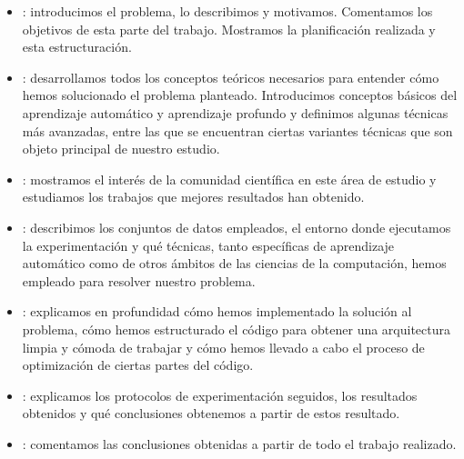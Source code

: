 \begin{itemize}
	\item {}: introducimos el problema, lo describimos y motivamos. Comentamos los objetivos de esta parte del trabajo. Mostramos la planificación realizada y esta estructuración.
	\item {}: desarrollamos todos los conceptos teóricos necesarios para entender cómo hemos solucionado el problema planteado. Introducimos conceptos básicos del aprendizaje automático y aprendizaje profundo y definimos algunas técnicas más avanzadas, entre las que se encuentran ciertas variantes técnicas que son objeto principal de nuestro estudio.
	\item {}: mostramos el interés de la comunidad científica en este área de estudio y estudiamos los trabajos que mejores resultados han obtenido.
	\item {}: describimos los conjuntos de datos empleados, el entorno donde ejecutamos la experimentación y qué técnicas, tanto específicas de aprendizaje automático como de otros ámbitos de las ciencias de la computación, hemos empleado para resolver nuestro problema.
	\item {}: explicamos en profundidad cómo hemos implementado la solución al problema, cómo hemos estructurado el código para obtener una arquitectura limpia y cómoda de trabajar y cómo hemos llevado a cabo el proceso de optimización de ciertas partes del código.
	\item {}: explicamos los protocolos de experimentación seguidos, los resultados obtenidos y qué conclusiones obtenemos a partir de estos resultado.
	\item {}: comentamos las conclusiones obtenidas a partir de todo el trabajo realizado.

\end{itemize}

